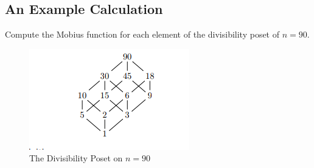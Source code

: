 \hypertarget{an-example-calculation}{%
\subsection{An Example Calculation}\label{an-example-calculation}}

\begin{exercise}

Compute the Mobius function for each element of the divisibility poset
of \(n=90\).

\end{exercise}

\begin{figure}
\centering
\includegraphics{figures/2019-06-09-15-13-51.png}
\caption{The Divisibility Poset on \(n=90\)}
\end{figure}

